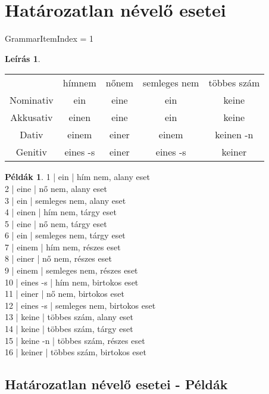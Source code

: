 \documentclass{article}
\theoremstyle{definition}
\newtheorem*{exmp}{Példák}
\newtheorem*{desc}{Leírás}
\begin{document}
\section{Határozatlan névelő esetei}

GrammarItemIndex = 1

\begin{desc}
\begin{tabular}{ccccc}
 & hímnem & nőnem & semleges nem & többes szám \\
 Nominativ & ein & eine & ein & keine \\
 Akkusativ & einen & eine & ein & keine \\
 Dativ & einem & einer & einem & keinen -n \\
 Genitiv & eines -s & einer & eines -s & keiner \\
\end{tabular}
\end{desc}

\begin{exmp}
1 | ein | hím nem, alany eset\\
2 | eine | nő nem, alany eset\\
3 | ein | semleges nem, alany eset\\
4 | einen | hím nem, tárgy eset\\
5 | eine | nő nem, tárgy eset\\
6 | ein | semleges nem, tárgy eset\\
7 | einem | hím nem, részes eset\\
8 | einer | nő nem, részes eset\\
9 | einem | semleges nem, részes eset\\
10 | eines -s | hím nem, birtokos eset\\
11 | einer | nő nem, birtokos eset\\
12 | eines -s | semleges nem, birtokos eset\\
13 | keine | többes szám, alany eset\\
14 | keine | többes szám, tárgy eset\\
15 | keine -n | többes szám, részes eset\\
16 | keiner | többes szám, birtokos eset\\
\end{exmp}

\subsection{Határozatlan névelő esetei - Példák}
\end{document}
